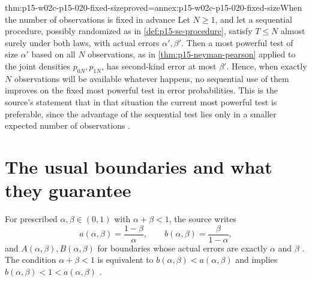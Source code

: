 \begin{hbtheorem}{thm:p15-w02c-p15-020-fixed-size}{proved=annex:p15-w02c-p15-020-fixed-size}{When the number of observations is fixed in advance}
Let \(N\geq1\), and let a sequential procedure, possibly randomized as
in \cref{def:p15-se-procedure}, satisfy \(T\leq N\) almost surely
under both laws, with actual errors \(\alpha',\beta'\).
Then a most powerful test of size \(\alpha'\) based on all \(N\)
observations, as in \cref{thm:p15-neyman-pearson} applied to the
joint densities \(p_{0N},p_{1N}\), has second-kind error at most
\(\beta'\).
Hence, when exactly \(N\) observations will be available whatever
happens, no sequential use of them improves on the fixed most powerful
test in error probabilities. This is the source's statement that in
that situation the current most powerful test is preferable, since the
advantage of the sequential test lies only in a smaller expected
number of observations \cite[Introduction, p.~119]{Wald1945SequentialTests}.
\end{hbtheorem}

\section{The usual boundaries and what they guarantee}
\label{sec:p15-w02c-p15-020-nominal}

For prescribed \(\alpha,\beta\in(0,1)\) with \(\alpha+\beta<1\), the
source writes
\[
 a(\alpha,\beta)=\frac{1-\beta}{\alpha},\qquad
 b(\alpha,\beta)=\frac{\beta}{1-\alpha},
\]
and \(A(\alpha,\beta),B(\alpha,\beta)\) for boundaries whose actual
errors are exactly \(\alpha\) and \(\beta\)
\cite[Section 3.3, p.~131]{Wald1945SequentialTests}.
The condition \(\alpha+\beta<1\) is equivalent to
\(b(\alpha,\beta)<a(\alpha,\beta)\) and implies
\(b(\alpha,\beta)<1<a(\alpha,\beta)\)
\cite[Section 3.4, p.~134]{Wald1945SequentialTests}.

